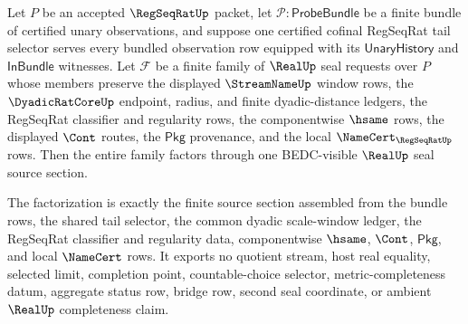 \begin{theorem}
\label{thm:regseqrat-tail-selector-bundle-induction-real-seal}
Let $P$ be an accepted $\RegSeqRatUp$ packet, let
$\mathcal P:\mathsf{ProbeBundle}$ be a finite bundle of certified unary
observations, and suppose one certified cofinal RegSeqRat tail selector serves
every bundled observation row equipped with its $\mathsf{UnaryHistory}$ and
$\mathsf{InBundle}$ witnesses. Let $\mathcal F$ be a finite family of
$\RealUp$ seal requests over $P$ whose members preserve the displayed
$\StreamNameUp$ window rows, the $\DyadicRatCoreUp$ endpoint, radius, and
finite dyadic-distance ledgers, the RegSeqRat classifier and regularity rows,
the componentwise $\hsame$ rows, the displayed $\Cont$ routes, the
$\mathsf{Pkg}$ provenance, and the local $\NameCert_{\RegSeqRatUp}$ rows.
Then the entire family factors through one BEDC-visible $\RealUp$ seal source
section.

The factorization is exactly the finite source section assembled from the
bundle rows, the shared tail selector, the common dyadic scale-window ledger,
the RegSeqRat classifier and regularity data, componentwise $\hsame$,
$\Cont$, $\mathsf{Pkg}$, and local $\NameCert$ rows. It exports no quotient
stream, host real equality, selected limit, completion point, countable-choice
selector, metric-completeness datum, aggregate status row, bridge row, second
seal coordinate, or ambient $\RealUp$ completeness claim.
\end{theorem}
